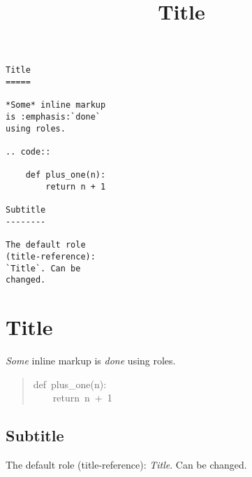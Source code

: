 \documentclass[a4paper, twocolumn]{article}
\title{\phantomsection%
  Title%
  \label{title}}
\author{}
\date{}
\providecommand*{\DUroletitlereference}[1]{\textsl{#1}}
\begin{document}
\LARGE
\begin{verbatim}
Title
=====

*Some* inline markup 
is :emphasis:`done`
using roles.

.. code::
    
    def plus_one(n):
        return n + 1
        
Subtitle
--------

The default role 
(title-reference):
`Title`. Can be
changed.
\end{verbatim}

\newpage

\Huge


\section{\Huge{Title}}

\emph{Some} inline markup is \emph{done} using roles.
%
\begin{quote}{\ttfamily \raggedright \noindent
def~plus\_one(n):\\
~~~~return~n~+~1
}
\end{quote}

\subsection{\huge{Subtitle}}

The default role (title-reference): \DUroletitlereference{Title}. Can be changed.
\end{document}
